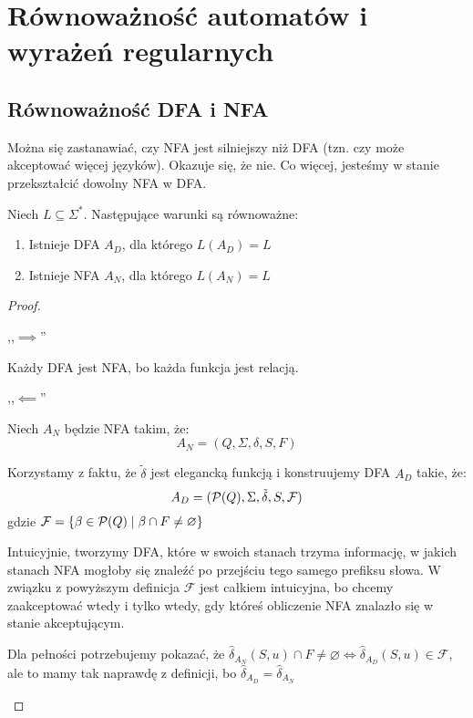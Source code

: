 \section{Równoważność automatów i wyrażeń regularnych}

\subsection{Równoważność DFA i NFA}

Można się zastanawiać, czy NFA jest silniejszy niż DFA (tzn. czy może akceptować więcej języków).
Okazuje się, że nie. Co więcej, jesteśmy w stanie przekształcić dowolny NFA w DFA.
\begin{theorem}
    Niech \( L \subseteq \Sigma^* \).
    Następujące warunki są równoważne:
    \begin{enumerate}
            \item Istnieje DFA \( A_D \), dla którego \( L(A_D) = L \)
        \item Istnieje NFA \( A_N \), dla którego \( L(A_N) = L \) 
    \end{enumerate}
\end{theorem}
\begin{proof} 
    \begin{description}
        \item ,,\( \implies \)''
        
        Każdy DFA jest NFA, bo każda funkcja jest relacją.
            
        \item ,,\( \impliedby \)''
        
        Niech \(A_N\) będzie NFA takim, że: 
        \[ A_N = (Q, \Sigma, \delta, S, F) \]
        
        Korzystamy z faktu, że \( \tilde \delta \) jest elegancką funkcją i konstruujemy DFA \(A_D\) takie, że:
        \[ A_D = (\operatorname{\mathcal{P}}(Q), \Sigma, \tilde \delta, S, \mathcal{F}) \]
        gdzie \( \mathcal{F} = \set{\beta \in \powerset(Q) \mid \beta \cap F \neq \varnothing} \)
        
        Intuicyjnie, tworzymy DFA, które w swoich stanach trzyma informację, w jakich stanach NFA mogłoby się znaleźć po przejściu tego samego prefiksu słowa. W związku z powyższym definicja \( \mathcal{F} \) jest całkiem intuicyjna, bo chcemy zaakceptować wtedy i tylko wtedy, gdy któreś obliczenie NFA znalazło się w stanie akceptującym.  
        
        Dla pełności potrzebujemy pokazać, że \( \hat \delta_{A_N}(S, u) \cap F \neq \varnothing \iff \hat \delta_{A_D}(S, u) \in \mathcal{F} \),
        ale to mamy tak naprawdę z definicji, bo \( \hat \delta_{A_D} = \hat \delta_{A_N} \)
    \end{description}
\end{proof}


